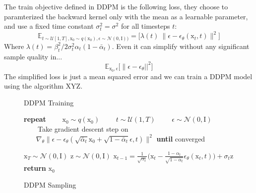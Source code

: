 The train objective defined in DDPM is the following loss, they choose to
paramterized the backward kernel only with the mean as a learnable parameter, 
and use a fixed time constant $\sigma_{t}^{2}=\sigma^{2}$ for all timesteps $t$:
\begin{equation}\label{eqn:ho-eq12}
    \mathbb{E}_{t\sim\mathcal{U}[1, T], \mathrm{x}_{0}\sim q(\mathrm{x}_{0}), \epsilon\sim\mathcal{N}(0, \mathrm{I}))} = \big[\lambda(t) ~ \|\epsilon - \epsilon_{\theta}(\mathrm{x}_{t}, t) \|^{2} \big]
\end{equation}
Where $\lambda(t)= \beta_{t}^{2} / 2\sigma_{t}^{2}\alpha_{t}(1-\bar{\alpha}_{t})$. Even it can simplify without any significant sample quality in...
\begin{equation}\label{eqn:ho-eq14}
    \mathbb{E}_{\mathrm{x}_{0}, \epsilon} \big[\| \epsilon - \epsilon_{\theta} ||^{2} \big]
\end{equation}
The simplified loss is just a mean squared error and we can train a DDPM
model using the algorithm XYZ.
\begin{figure}[ht]
    \begin{minipage}{0.45\textwidth}
    \begin{algorithm}[H]
        \caption{DDPM Training}
        \begin{algorithmic}
            \STATE \textbf{repeat}
            \STATE  ~~~~$\mathrm{x}_{0}\sim q(\mathrm{x_{0}})$
            \STATE  ~~~~$t\sim \mathcal{U}(1, T)$
            \STATE  ~~~~$\epsilon\sim \mathcal{N}(0, \mathrm{I})$
            \STATE  ~~~~Take gradient descent step on
            \STATE  $~~~~~~~~\nabla_{\theta}\|\epsilon - \epsilon_{\theta}(\sqrt{\bar{\alpha}_{t}}\mathrm{x}_{0} + \sqrt{1-\bar{\alpha}_{t}}\epsilon, t) \|^{2}$
            \STATE \textbf{until} converged
        \end{algorithmic}
    \end{algorithm}
    \end{minipage}
    \hspace{0.25cm}
    \begin{minipage}{0.45\textwidth}
    \begin{algorithm}[H]
        \caption{DDPM Sampling}
        \begin{algorithmic}
        \STATE  $\mathrm{x}_{T}\sim\mathcal{N}(\mathrm{0}, \mathrm{I})$
            \STATE $\mathrm{z}\sim\mathcal{N}(0, \mathrm{I})$
            \STATE $\mathrm{x}_{t-1}=\frac{1}{\sqrt{\alpha_{t}}} \bigg(\mathrm{x}_{t} - \frac{1-\alpha_{t}}{\sqrt{1-\bar{\alpha}_{t}}}\epsilon_{\theta}(\mathrm{x}_{t}, t)\bigg) + \sigma_{t}\mathrm{z}$
        \ENDFOR
        \STATE \textbf{return} $\mathrm{x}_{0}$
        \end{algorithmic}
    \end{algorithm}
    \end{minipage}
    \end{figure}

